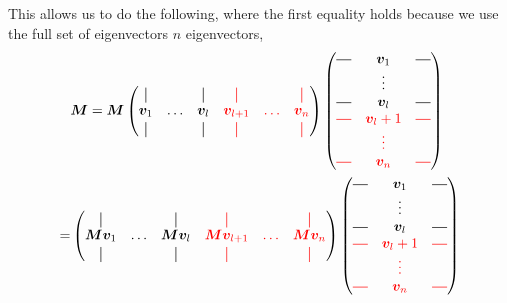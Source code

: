     This allows us to do the following, where the first equality holds because we use the full set of eigenvectors $n$ eigenvectors,
    \begin{align}
        &\bm{M} = \bm{M}
        \begin{pmatrix}
        \vertbar &        & \vertbar & \red{\vertbar    } & \red{        }& \red{ \vertbar }\\
        \bm{v}_1 & \hdots & \bm{v}_l & \red{\bm{v}_{l+1}} & \red{ \hdots }& \red{ \bm{v}_n }\\
        \vertbar &        & \vertbar & \red{\vertbar    } & \red{        }& \red{ \vertbar }
        \end{pmatrix}
        \begin{pmatrix}
            \horzbar & \bm{v}_1   & \horzbar \\
                     & \vdots     &          \\
            \horzbar & \bm{v}_l   & \horzbar \\
            \red{\horzbar} & \red{\bm{v}_l+1} & \red{\horzbar} \\
                           & \red{\vdots    } &                \\
            \red{\horzbar} & \red{\bm{v}_n  } & \red{\horzbar} \\
        \end{pmatrix} \\
        =&
        \begin{pmatrix}
        \vertbar       &        & \vertbar       & \red{\vertbar    }       & \red{        }& \red{ \vertbar }       \\
        \bm{M}\bm{v}_1 & \hdots & \bm{M}\bm{v}_l & \red{\bm{M}\bm{v}_{l+1}} & \red{ \hdots }& \red{\bm{M} \bm{v}_n } \\
        \vertbar       &        & \vertbar       & \red{\vertbar    }       & \red{        }& \red{ \vertbar }
        \end{pmatrix}
        \begin{pmatrix}
            \horzbar & \bm{v}_1   & \horzbar \\
                     & \vdots     &          \\
            \horzbar & \bm{v}_l   & \horzbar \\
            \red{\horzbar} & \red{\bm{v}_l+1} & \red{\horzbar} \\
                           & \red{\vdots    } &                \\
            \red{\horzbar} & \red{\bm{v}_n  } & \red{\horzbar} \\

\end{pmatrix}
\end{align}
